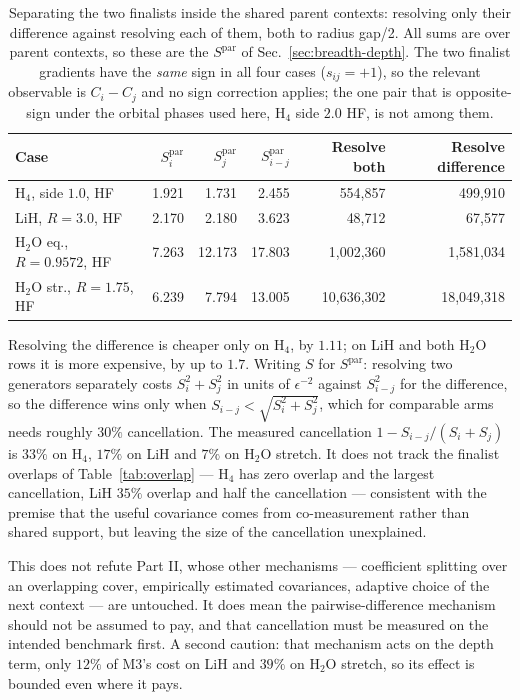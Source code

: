 \documentclass[10pt]{article}
\begin{document}
\begin{table}[!htbp]
\centering
\scriptsize
\caption{Separating the two finalists inside the shared parent contexts: resolving only their difference against resolving each of them, both to radius gap/2. All sums are over parent contexts, so these are the $S^{\text{par}}$ of Sec.~\ref{sec:breadth-depth}. The two finalist gradients have the \emph{same} sign in all four cases ($s_{ij}=+1$), so the relevant observable is $C_i-C_j$ and no sign correction applies; the one pair that is opposite-sign under the orbital phases used here, H$_4$ side $2.0$ HF, is not among them.}
\label{tab:difference}
\begin{tabular}{lrrrrr}
\toprule
Case & $S^{\text{par}}_i$ & $S^{\text{par}}_j$ & $S^{\text{par}}_{i-j}$ & Resolve both & Resolve difference \\
\midrule
H$_4$, side $1.0$, HF & 1.921 & 1.731 & 2.455 & 554,857 & 499,910 \\
LiH, $R{=}3.0$, HF & 2.170 & 2.180 & 3.623 & 48,712 & 67,577 \\
H$_2$O eq., $R{=}0.9572$, HF & 7.263 & 12.173 & 17.803 & 1,002,360 & 1,581,034 \\
H$_2$O str., $R{=}1.75$, HF & 6.239 & 7.794 & 13.005 & 10,636,302 & 18,049,318 \\
\bottomrule
\end{tabular}
\end{table}

Resolving the difference is cheaper only on H$_4$, by $1.11$; on LiH and both H$_2$O rows it is more expensive, by up to $1.7$. Writing $S$ for $S^{\text{par}}$: resolving two generators separately costs $S_i^2+S_j^2$ in units of $\epsilon^{-2}$ against $S_{i-j}^2$ for the difference, so the difference wins only when $S_{i-j}<\sqrt{S_i^2+S_j^2}$, which for comparable arms needs roughly $30\%$ cancellation. The measured cancellation $1-S_{i-j}/(S_i+S_j)$ is $33\%$ on H$_4$, $17\%$ on LiH and $7\%$ on H$_2$O stretch. It does not track the finalist overlaps of Table~\ref{tab:overlap} --- H$_4$ has zero overlap and the largest cancellation, LiH $35\%$ overlap and half the cancellation --- consistent with the premise that the useful covariance comes from co-measurement rather than shared support, but leaving the size of the cancellation unexplained.

This does not refute Part II, whose other mechanisms --- coefficient splitting over an overlapping cover, empirically estimated covariances, adaptive choice of the next context --- are untouched. It does mean the pairwise-difference mechanism should not be assumed to pay, and that cancellation must be measured on the intended benchmark first. A second caution: that mechanism acts on the depth term, only $12\%$ of M3's cost on LiH and $39\%$ on H$_2$O stretch, so its effect is bounded even where it pays.
\end{document}
